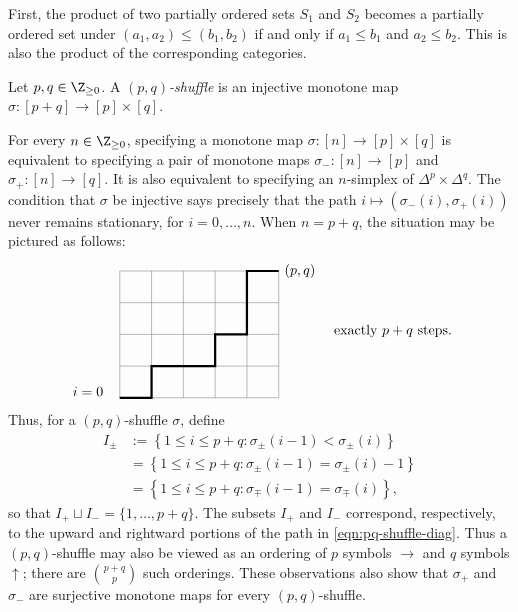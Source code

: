 First, the product of two partially ordered sets $S_1$ and $S_2$ becomes a
partially ordered set under
$(a_1,a_2)\leq(b_1,b_2)$ if and only if $a_1\leq b_1$ and $a_2\leq b_2$.
This is also the product of the corresponding categories.

\begin{definition}\label{def:pq-shuffle}
	Let $p,q\in\Z_{\geq0}$. A \emph{$(p,q)$-shuffle} is an injective monotone
	map $\sigma:[p+q]\to[p]\times[q]$.
\end{definition}

For every $n\in\Z_{\geq0}$, specifying a monotone map
$\sigma:[n]\to[p]\times[q]$ is equivalent to specifying a pair of monotone
maps $\sigma_-:[n]\to[p]$ and $\sigma_+:[n]\to[q]$. It is also equivalent
to specifying an $n$-simplex of $\Delta^p\times\Delta^q$. The condition that
$\sigma$ be injective says precisely that the path
$i\mapsto(\sigma_-(i),\sigma_+(i))$ never remains stationary, for
$i=0,\ldots,n$. When $n=p+q$, the situation may be pictured as follows:
\begin{equation}\label{eqn:pq-shuffle-diag}
	\begin{tikzpicture}[scale=0.8, baseline=(O)]
		\draw[thin, gray] (0, 0) grid (5, 4);
		\node at (-1, 0.2) {$i=0$};
		\draw[ultra thick] (0, 0) -- (1, 0) -- (1, 1) -- (2, 1) -- (3, 1) -- (3, 2) -- (4, 2) -- (4, 3) -- (4, 4) -- (5, 4) node[right] {$(p, q)$};
		\coordinate (O) at (0, 2);
	\end{tikzpicture}
	\quad
	\text{exactly $p+q$ steps.}
\end{equation}
Thus, for a $(p,q)$-shuffle $\sigma$, define
\begin{align*}
	I_\pm & := \left\{ 1 \leq i \leq p+q : \sigma_\pm(i-1) < \sigma_\pm(i) \right\} \\
	& = \left\{ 1 \leq i \leq p+q : \sigma_\pm(i-1) = \sigma_\pm(i) - 1 \right\} \\
	& = \left\{ 1 \leq i \leq p+q: \sigma_\mp(i-1) = \sigma_\mp(i) \right\},
\end{align*}
so that $I_+\sqcup I_-=\{1,\ldots,p+q\}$. The subsets $I_+$ and $I_-$
correspond, respectively, to the upward and rightward portions of the path in
\eqref{eqn:pq-shuffle-diag}. Thus a $(p,q)$-shuffle may also be viewed as an
ordering of $p$ symbols $\rightarrow$ and $q$ symbols $\uparrow$; there are
$\binom{p+q}{p}$ such orderings. These observations also show that
$\sigma_+$ and $\sigma_-$ are surjective monotone maps for every
$(p,q)$-shuffle.

